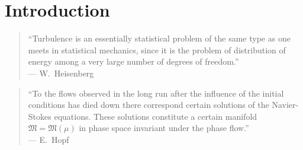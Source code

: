 \documentclass[floatfix,aps,pre,preprint,superscriptaddress,nofootinbib,amsmath,amssymb]{revtex4-2}
\begin{document}
\section{Introduction}

\begin{quote}
``Turbulence is an essentially statistical problem of the same type as one meets in statistical mechanics, since it is the
problem of distribution of energy among a very large number of degrees of freedom.''\\
\hspace*{\fill}--- W.~Heisenberg~\cite{Heisenberg1948PRSA}
\end{quote}

\noindent\begin{minipage}{\linewidth}
\begin{quote}
``To the flows observed in the long run after the influence of the initial conditions has died down there correspond
certain solutions of the Navier-Stokes equations. These solutions constitute a certain manifold
$\mathfrak{M}=\mathfrak{M}(\mu)$ in phase space invariant under the phase flow.''\\
\hspace*{\fill}--- E.~Hopf~\cite[p.~305]{Hopf1948}
\end{quote}
\end{minipage}
\medskip
\end{document}
